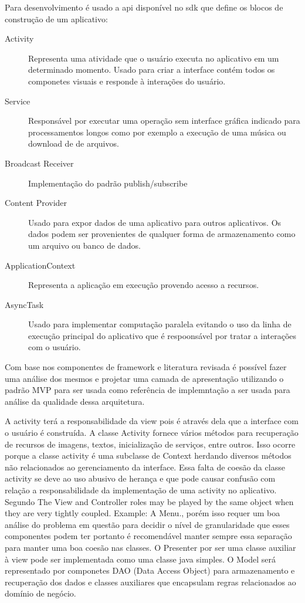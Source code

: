Para desenvolvimento é usado a api disponível no sdk que define
os blocos de construção de um aplicativo:

\begin{description}
  \item[Activity] Representa uma atividade que o usuário executa no aplicativo
  em um determinado momento. Usado para criar a interface contém todos os
  componetes visuais e responde à interações do usuário.
  \item[Service] Responsável por executar uma operação sem interface gráfica
  indicado para processamentos longos como por exemplo a execução de uma música
  ou download de de arquivos.
  \item[Broadcast Receiver] Implementação do padrão publish/subscribe 
  \item[Content Provider] Usado para expor dados de uma aplicativo para outros
  aplicativos. Os dados podem ser provenientes de qualquer forma de
  armazenamento como um arquivo ou banco de dados.
  \item[ApplicationContext] Representa a aplicação em execução provendo acesso
  a recursos.
  \item[AsyncTask] Usado para implementar computação paralela evitando o uso da
  linha de execução principal do aplicativo que é respoonsável por tratar a
  interações com o usuário.
\end{description}


Com base nos componentes de framework e literatura revisada é possível fazer
uma análise dos mesmos e projetar uma camada de apresentação utilizando o padrão
MVP para ser usada como referência de implemntação a ser usada para análise da
qualidade dessa arquitetura.

A activity terá a responsabilidade da view pois é através dela que a interface
com o usuário é construída. A classe Activity fornece vários métodos para
recuperação de recursos de imagens, textos, inicialização de serviços, entre
outros. Isso ocorre porque a classe activity é uma subclasse de Context herdando
diversos métodos não relacionados ao gerenciamento da interface. Essa falta de
coesão da classe activity se deve ao uso abusivo de herança e que pode causar
confusão com relação a responsabilidade da implementação de uma activity no
aplicativo. Segundo  The View and Controller roles
may be played by the same object when they are very tightly coupled. Example: A
Menu., porém isso requer um boa análise do problema em questão para decidir o
nível de granularidade que esses componentes podem ter portanto é recomendável
manter sempre essa separação para manter uma boa coesão nas classes. O Presenter
por ser uma classe auxiliar à view pode ser implementada como uma classe java
simples. O Model será representado por componetes DAO (Data Access Object) para
armazenamento e recuperação dos dados e classes auxiliares que encapsulam
regras relacionados ao domínio de negócio.

